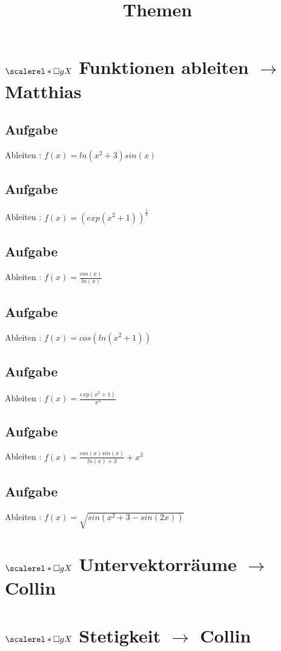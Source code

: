 \documentclass[11pt]{article}
\def\msquare{\mathord{\scalerel*{\Box}{gX}}}
\begin{document}
    \title{Themen}
    \maketitle
    \section{$\msquare$ \hspace*{5mm} Funktionen ableiten $\longrightarrow$ Matthias}
    \subsection{Aufgabe}
    Ableiten : $f(x)=ln(x^2+3)sin(x)$
    \subsection{Aufgabe}
    Ableiten : $f(x)=(exp(x^2+1))^{\frac{1}{2}}$
    \subsection{Aufgabe}
    Ableiten : $f(x)=\frac{cos(x)}{ln(x)}$
    \subsection{Aufgabe}
    Ableiten : $f(x)=cos(ln(x^2+1))$
    \subsection{Aufgabe}
    Ableiten : $f(x)=\frac{exp(x^2+1)}{x^3}$
    \subsection{Aufgabe}
    Ableiten : $f(x)=\frac{cos(x)sin(x)}{ln(x)+3}+x^3$
    \subsection{Aufgabe}
    Ableiten : $f(x)=\sqrt{sin(x^2+3-sin(2x))}$

    \newpage\section{$\msquare$ \hspace*{5mm} Untervektorräume $\longrightarrow$ Collin}
    \section{$\msquare$ \hspace*{5mm} Stetigkeit $\longrightarrow$ Collin}
\end{document}
